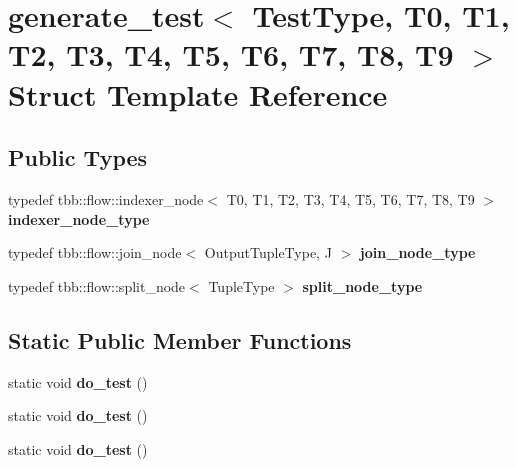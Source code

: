 \hypertarget{classgenerate__test}{}\section{generate\+\_\+test$<$ Test\+Type, T0, T1, T2, T3, T4, T5, T6, T7, T8, T9 $>$ Struct Template Reference}
\label{classgenerate__test}
\subsection*{Public Types}
\begin{DoxyCompactItemize}
\item 
\hypertarget{classgenerate__test_a5a46277c2cdc0c39162044edda2cc204}{}typedef tbb\+::flow\+::indexer\+\_\+node$<$ T0, T1, T2, T3, T4, T5, T6, T7, T8, T9 $>$ {\bfseries indexer\+\_\+node\+\_\+type}\label{classgenerate__test_a5a46277c2cdc0c39162044edda2cc204}

\item 
\hypertarget{classgenerate__test_aad2971f29a80c52038b67107c23ca339}{}typedef tbb\+::flow\+::join\+\_\+node$<$ Output\+Tuple\+Type, J $>$ {\bfseries join\+\_\+node\+\_\+type}\label{classgenerate__test_aad2971f29a80c52038b67107c23ca339}

\item 
\hypertarget{classgenerate__test_aa00b03abccf89a5a6797dfc607a20faa}{}typedef tbb\+::flow\+::split\+\_\+node$<$ Tuple\+Type $>$ {\bfseries split\+\_\+node\+\_\+type}\label{classgenerate__test_aa00b03abccf89a5a6797dfc607a20faa}

\end{DoxyCompactItemize}
\subsection*{Static Public Member Functions}
\begin{DoxyCompactItemize}
\item 
\hypertarget{classgenerate__test_ab6455bd5c2efacbc40155f3d04e79808}{}static void {\bfseries do\+\_\+test} ()\label{classgenerate__test_ab6455bd5c2efacbc40155f3d04e79808}

\item 
\hypertarget{classgenerate__test_ab6455bd5c2efacbc40155f3d04e79808}{}static void {\bfseries do\+\_\+test} ()\label{classgenerate__test_ab6455bd5c2efacbc40155f3d04e79808}

\item 
\hypertarget{classgenerate__test_ab6455bd5c2efacbc40155f3d04e79808}{}static void {\bfseries do\+\_\+test} ()\label{classgenerate__test_ab6455bd5c2efacbc40155f3d04e79808}

\end{DoxyCompactItemize}


